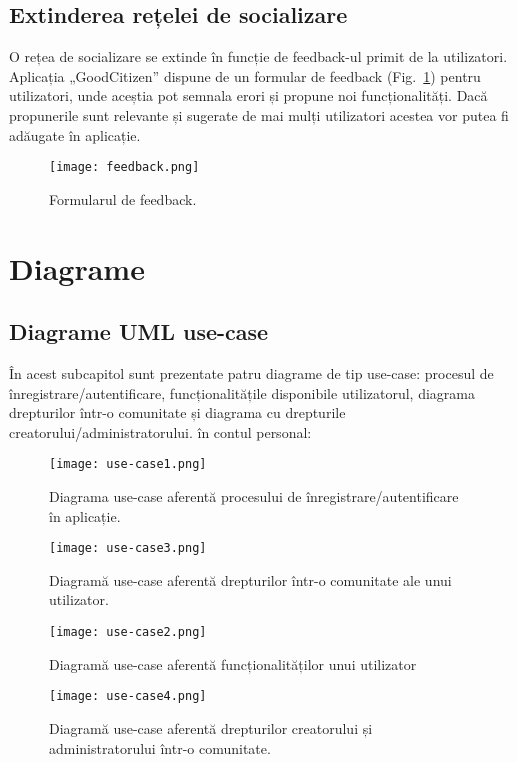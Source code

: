 \subsection{Extinderea rețelei de socializare}
    O rețea de socializare se extinde în funcție de feedback-ul primit de la utilizatori. Aplicația 
    „GoodCitizen” dispune de un formular de feedback (Fig.~\ref{fig:feedback}) pentru utilizatori, unde aceștia pot semnala erori 
    și propune noi funcționalități. Dacă propunerile sunt relevante și sugerate de mai mulți utilizatori acestea 
    vor putea fi adăugate în aplicație. 
    \begin{figure}[h]
    \texttt{[image: feedback.png]}
    \centering
    \caption{Formularul de feedback.}
    \label{fig:feedback}
    \end{figure}   

\section{Diagrame}
\subsection{Diagrame UML use-case}
    În acest subcapitol sunt prezentate patru diagrame de tip use-case: procesul de
înregistrare/autentificare, funcționalitățile disponibile utilizatorul,
diagrama drepturilor într-o comunitate și diagrama cu drepturile creatorului/administratorului.
în contul personal:
    \begin{figure}[h]
    \texttt{[image: use-case1.png]}
    \centering
    \caption{Diagrama use-case aferentă procesului de înregistrare/autentificare în aplicație.}
    \label{fig:use-case1}
    \end{figure}
    \begin{figure}[h]
    \texttt{[image: use-case3.png]}
    \centering
    \caption{Diagramă use-case aferentă drepturilor într-o comunitate ale unui utilizator.}
    \label{fig:use-case3}
    \end{figure} 
    \begin{figure}[h]
    \texttt{[image: use-case2.png]}
    \centering
    \caption{Diagramă use-case aferentă funcționalităților unui utilizator}
    \label{fig:use-case2}
    \end{figure}    
    \begin{figure}[h]
    \texttt{[image: use-case4.png]}
    \centering
    \caption{Diagramă use-case aferentă drepturilor creatorului și administratorului într-o comunitate.}
    \label{fig:use-case4}
    \end{figure}
    \clearpage    
